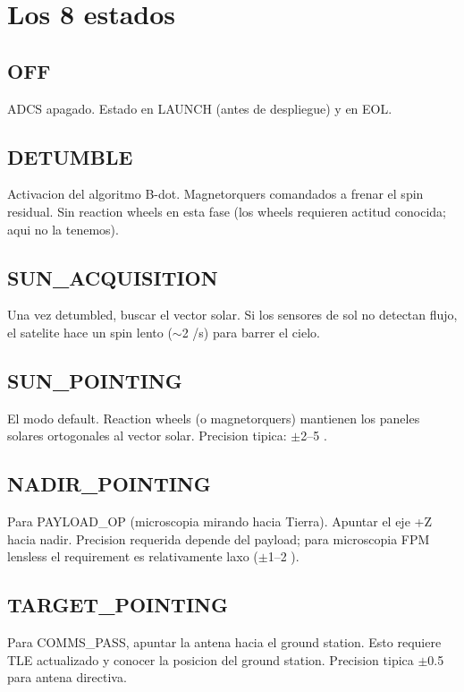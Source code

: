 \documentclass[11pt,a4paper,oneside,openright]{book}
\begin{document}
\section{Los 8 estados}

\subsection*{OFF}

ADCS apagado. Estado en LAUNCH (antes de despliegue) y en EOL.

\subsection*{DETUMBLE}

Activacion del algoritmo B-dot. Magnetorquers comandados a frenar
el spin residual. Sin reaction wheels en esta fase (los wheels
requieren actitud conocida; aqui no la tenemos).

\subsection*{SUN\_ACQUISITION}

Una vez detumbled, buscar el vector solar. Si los sensores de sol
no detectan flujo, el satelite hace un spin lento ($\sim$2 \textdegree/s)
para barrer el cielo.

\subsection*{SUN\_POINTING}

El modo default. Reaction wheels (o magnetorquers) mantienen los
paneles solares ortogonales al vector solar. Precision tipica:
$\pm$2--5 \textdegree.

\subsection*{NADIR\_POINTING}

Para PAYLOAD\_OP (microscopia mirando hacia Tierra). Apuntar el eje
+Z hacia nadir. Precision requerida depende del payload; para
microscopia FPM lensless el requirement es relativamente laxo
($\pm$1--2 \textdegree).

\subsection*{TARGET\_POINTING}

Para COMMS\_PASS, apuntar la antena hacia el ground station. Esto
requiere TLE actualizado y conocer la posicion del ground station.
Precision tipica $\pm$0.5 \textdegree~ para antena directiva.
\end{document}
